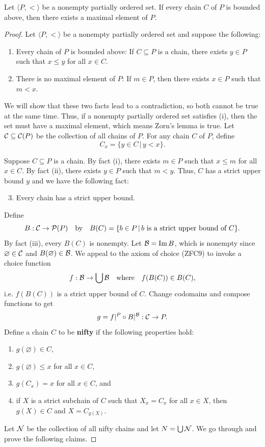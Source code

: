 \begin{theorem}\label{ch1thm_zornslemma}
	Let $\langle P, <\rangle$ be a nonempty partially ordered set.
	If every chain $C$ of $P$ is bounded above, then there exists a maximal element of $P$.
\end{theorem}
\begin{proof}
	Let $\langle P, <\rangle$ be a nonempty partially ordered set and suppose the following:
	\begin{enumerate}[itemsep=-0.8ex, label=(\roman*)]
		\item Every chain of $P$ is bounded above: 
		If $C\subseteq P$ is a chain, there exists $y\in P$ such that $x\le y$ for all $x\in C$. 
		\item There is no maximal element of $P$: 
		If $m\in P$, then there exists $x\in P$ such that $m < x$. 
	\end{enumerate}
	We will show that these two facts lead to a contradiction, so both cannot be true at the same time.
	Thus, if a nonempty partially ordered set satisfies (i), then the set must have a maximal element, which means Zorn's lemma is true. 
	Let $\mathcal{C}\subseteq\mathcal{C}(P)$ be the collection of all chains of $P$. 
	For any chain $C$ of $P$, define 
	\[ C_{x} = \{ y\in C \,|\, y < x \}. \]
	
	Suppose $C\subseteq P$ is a chain.
	By fact (i), there exists $m\in P$ such that $x\le m$ for all $x\in C$. 
	By fact (ii), there exists $y\in P$ such that $m < y$.
	Thus, $C$ has a strict upper bound $y$ and we have the following fact:
	\begin{enumerate}[itemsep=-0.8ex, label=(\roman*)]\setcounter{enumi}{2}
		\item Every chain has a strict upper bound.
	\end{enumerate}
	Define 
	\[ B:\mathcal{C}\rightarrow\mathcal{P}(P) \quad\text{by}\quad B(C) = \{ b\in P \,|\, b\text{ is a strict upper bound of } C \}. \]
	By fact (iii), every $B(C)$ is nonempty. 
	Let $\mathcal{B} = \operatorname{Im} B$, which is nonempty since $\varnothing\in\mathcal{C}$ and $B(\varnothing)\in\mathcal{B}$. 
	We appeal to the axiom of choice (ZFC9) to invoke a choice function
	\[ f:\mathcal{B}\rightarrow \bigcup\mathcal{B} \quad\text{where}\quad f(B(C))\in B(C), \]
	i.e. $f(B(C))$ is a strict upper bound of $C$. 
	Change codomains and compose functions to get
	\[ g = f|^{P}\circ B|^{\mathcal{B}}:\mathcal{C}\rightarrow P. \]
	Define a chain $C$ to be \textbf{nifty} if the following properties hold:
	\begin{enumerate}[itemsep=-0.3ex, label=(N\arabic*)]
		\item $g(\varnothing)\in C$,
		\item $g(\varnothing)\le x$ for all $x\in C$,
		\item $g(C_{x}) = x$ for all $x\in C$, and
		\item if $X$ is a strict subchain of $C$ such that $X_{x} = C_{x}$ for all $x\in X$, then $g(X)\in C$ and $X = C_{g(X)}$. 
	\end{enumerate}
	Let $\mathcal{N}$ be the collection of all nifty chains and let $N = \bigcup\mathcal{N}$.
	We go through and prove the following claims.
	

\end{proof}
